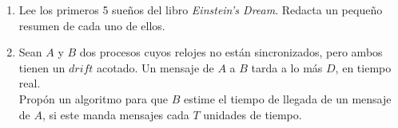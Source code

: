 \documentclass[12pt,a4paper]{report}
\begin{document}
\begin{enumerate}
		\item {
			Lee los primeros 5 sueños del libro \textit{Einstein's Dream}.
			Redacta un pequeño resumen de cada uno de ellos.
		}

		\item {
			Sean $A$ y $B$ dos procesos cuyos relojes no están sincronizados,
			pero ambos tienen un $drift$ acotado. Un mensaje de $A$ a $B$
			tarda a lo más $D$, en tiempo real.\\
			Propón un algoritmo para que $B$ estime el tiempo de llegada de un
			mensaje de $A$, si este manda mensajes cada $T$ unidades de tiempo.
		}
	\end{enumerate}
\end{document}
